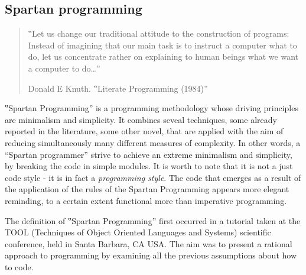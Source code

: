 \subsection{Spartan programming}

\begin{quote}
  ‟Let us change our traditional attitude to the construction of programs:
  Instead of imagining that our main task is to instruct a computer what to do,
  let us concentrate rather on explaining to human beings what we want a computer
  to do…”
  \begin{flushright}
   \upshape Donald E Knuth. ‟Literate Programming (1984)”
  \end{flushright}
\end{quote}


‟Spartan Programming” is a programming methodology whose driving principles are 
minimalism and simplicity. It combines seveal techniques, 
some already reported in the literature, some other novel, that are applied 
with the aim of reducing 
simultaneously many different measures of complexity.  
In other words, a ``Spartan programmer'' strive
to achieve an extreme minimalism and simplicity, by breaking 
the code in simple modules.  
It is worth to note that it is not a just code style - it is in fact a \emph{programming style}. 
The code that emerges as a result of the application of the rules of the 
Spartan Programming appears more elegant reminding, to a certain extent
functional more than imperative programming. 


The definition of ‟Spartan Programming” first occurred in a tutorial taken at
the TOOL (Techniques of Object Oriented Languages and Systems) scientific conference,
held in Santa Barbara, CA USA. %
The aim was to present a rational approach to programming by examining all the previous
assumptions about how to code.

